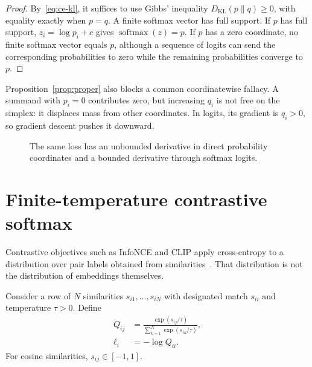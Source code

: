 \documentclass[11pt,a4paper]{article}
\theoremstyle{definition}
\theoremstyle{remark}
\newcommand{\KL}{D_{\mathrm{KL}}}
\begin{document}
\begin{proof}
By~\eqref{eq:ce-kl}, it suffices to use Gibbs' inequality $\KL(p\|q)\ge0$, with equality exactly when $p=q$.
A finite softmax vector has full support.
If $p$ has full support, $z_i=\log p_i+c$ gives $\operatorname{softmax}(z)=p$.
If $p$ has a zero coordinate, no finite softmax vector equals $p$, although a sequence of logits can send the corresponding probabilities to zero while the remaining probabilities converge to $p$.
\end{proof}

Proposition~\ref{prop:proper} also blocks a common coordinatewise fallacy.
A summand with $p_i=0$ contributes zero, but increasing $q_i$ is not free on the simplex: it displaces mass from other coordinates.
In logits, its gradient is $q_i>0$, so gradient descent pushes it downward.

\begin{figure}[ht]
\centering
{}
\caption{The same loss has an unbounded derivative in direct probability coordinates and a bounded derivative through softmax logits.}
\label{fig:gradient-coordinates}
\end{figure}

\section{Finite-temperature contrastive softmax}
\label{sec:contrastive}

Contrastive objectives such as InfoNCE and CLIP apply cross-entropy to a distribution over pair labels obtained from similarities~\cite{oord2018infonce,radford2021clip,chen2020simclr}.
That distribution is not the distribution of embeddings themselves.

Consider a row of $N$ similarities $s_{i1},\dots,s_{iN}$ with designated match $s_{ii}$ and temperature $\tau>0$.
Define
\begin{align}
  Q_{ij}
    &= \frac{\exp(s_{ij}/\tau)}{\sum_{k=1}^N\exp(s_{ik}/\tau)}, \\
  \ell_i
    &= -\log Q_{ii}.
\end{align}
For cosine similarities, $s_{ij}\in[-1,1]$.
\end{document}

